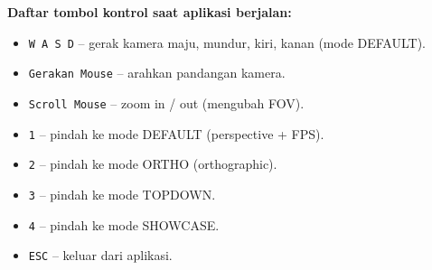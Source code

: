 \documentclass[12pt,a4paper]{article}
\begin{document}
\textbf{Daftar tombol kontrol saat aplikasi berjalan:}
\begin{itemize}
    \item \texttt{W A S D} -- gerak kamera maju, mundur, kiri, kanan (mode DEFAULT).
    \item \texttt{Gerakan Mouse} -- arahkan pandangan kamera.
    \item \texttt{Scroll Mouse} -- zoom in / out (mengubah FOV).
    \item \texttt{1} -- pindah ke mode DEFAULT (perspective + FPS).
    \item \texttt{2} -- pindah ke mode ORTHO (orthographic).
    \item \texttt{3} -- pindah ke mode TOPDOWN.
    \item \texttt{4} -- pindah ke mode SHOWCASE.
    \item \texttt{ESC} -- keluar dari aplikasi.
\end{itemize}
\end{document}
